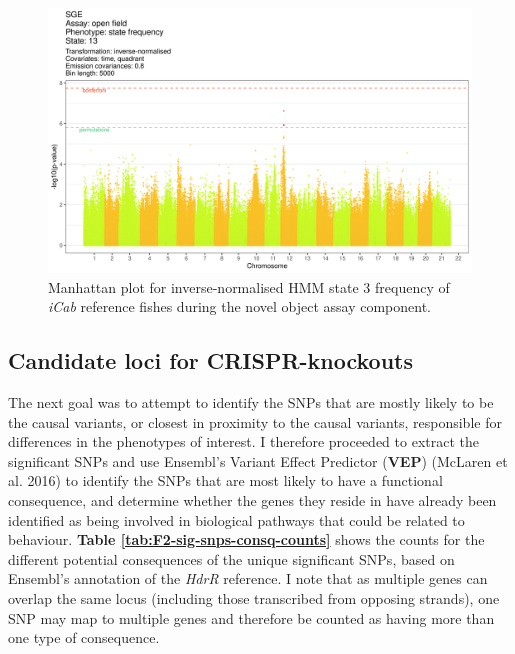 \documentclass[
]{book}
\begin{document}
\begin{figure}
\includegraphics[width=1\linewidth]{figs/mikk_behaviour/manhattans/sge_of_13_time-quadrant} \caption{Manhattan plot for inverse-normalised HMM state 3 frequency of \emph{\textcolor{iCab_424B4D}{iCab}} reference fishes during the novel object assay component.}\label{fig:F2-man-sge-of-13}
\end{figure}

\hypertarget{candidate-loci-for-crispr-knockouts}{%
\subsection{Candidate loci for CRISPR-knockouts}\label{candidate-loci-for-crispr-knockouts}}

The next goal was to attempt to identify the SNPs that are mostly likely to be the causal variants, or closest in proximity to the causal variants, responsible for differences in the phenotypes of interest. I therefore proceeded to extract the significant SNPs and use Ensembl's Variant Effect Predictor (\textbf{VEP}) (McLaren et al. 2016) to identify the SNPs that are most likely to have a functional consequence, and determine whether the genes they reside in have already been identified as being involved in biological pathways that could be related to behaviour. \textbf{Table \ref{tab:F2-sig-snps-consq-counts}} shows the counts for the different potential consequences of the unique significant SNPs, based on Ensembl's annotation of the \emph{HdrR} reference. I note that as multiple genes can overlap the same locus (including those transcribed from opposing strands), one SNP may map to multiple genes and therefore be counted as having more than one type of consequence.
\end{document}
